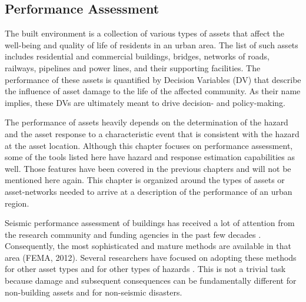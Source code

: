 
\begin{partbacktext}
\part{Performance Assessment}\label{part:Performance}

The built environment is a collection of various types of assets that affect the well-being and quality of life of residents in an urban area. The list of such assets includes residential and commercial buildings, bridges, networks of roads, railways, pipelines and power lines, and their supporting facilities. The performance of these assets is quantified by Decision Variables (DV) that describe the influence of asset damage to the life of the affected community. As their name implies, these DVs are ultimately meant to drive decision- and policy-making.

The performance of assets heavily depends on the determination of the hazard and the asset response to a characteristic event that is consistent with the hazard at the asset location. Although this chapter focuses on performance assessment, some of the tools listed here have hazard and response estimation capabilities as well. Those features have been covered in the previous chapters and will not be mentioned here again. This chapter is organized around the types of assets or asset-networks needed to arrive at a description of the performance of an urban region. 

Seismic performance assessment of buildings has received a lot of attention from the research community and funding agencies in the past few decades \citep{ATC 1985; FEMA Mitigation Division 2018b; 2018c; fajfar2004performancebased, FEMA  2012}. Consequently, the most sophisticated and mature methods are available in that area (FEMA, 2012). Several researchers have focused on adopting these methods for other asset types \citep{werner2006redars, chmielewski2016response} and for other types of hazards \citep{FEMA Mitigation Division, 2018c, attary2017performancebased, barbato2013performancebased, lange2014application}. This is not a trivial task because damage and subsequent consequences can be fundamentally different for non-building assets and for non-seismic disasters.  

\end{partbacktext}
